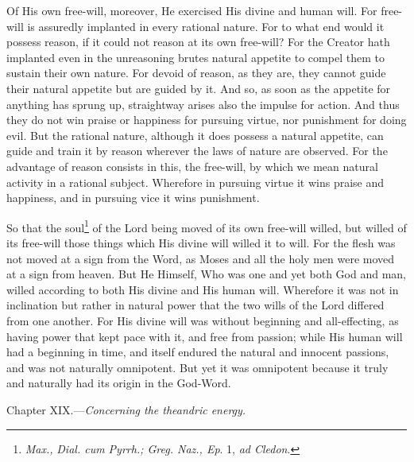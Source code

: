 Of His own free-will, moreover, He exercised His divine and human will. For free-will is assuredly implanted in every rational nature. For to what end would it possess reason, if it could not reason at its own free-will? For the Creator hath implanted even in the unreasoning brutes natural appetite to compel them to sustain their own nature. For devoid of reason, as they are, they cannot guide their natural appetite but are guided by it. And so, as soon as the appetite for anything has sprung up, straightway arises also the impulse for action. And thus they do not win praise or happiness for pursuing virtue, nor punishment for doing evil. But the rational nature, although it does possess a natural appetite, can guide and train it by reason wherever the laws of nature are observed. For the advantage of reason consists in this, the free-will, by which we mean natural activity in a rational subject. Wherefore in pursuing virtue it wins praise and happiness, and in pursuing vice it wins punishment.

So that the soul\footnote{\emph{Max.,} \emph{Dial. cum Pyrrh.; Greg. Naz., Ep}. 1, \emph{ad Cledon}.} of the Lord being moved of its own free-will willed, but willed of its free-will those things which His divine will willed it to will. For the flesh was not moved at a sign from the Word, as Moses and all the holy men were moved at a sign from heaven. But He Himself, Who was one and yet both God and man, willed according to both His divine and His human will. Wherefore it was not in inclination but rather in natural power that the two wills of the Lord differed from one another. For His divine will was without beginning and all-effecting, as having power that kept pace with it, and free from passion; while His human will had a beginning in time, and itself endured the natural and innocent passions, and was not naturally omnipotent. But yet it was omnipotent because it truly and naturally had its origin in the God-Word.


Chapter XIX.—\emph{Concerning the theandric energy.}

